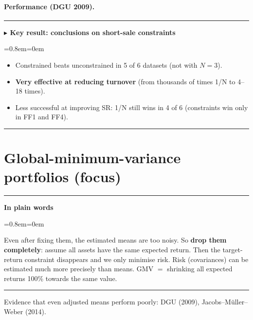 \documentclass[11pt,a4paper]{report}
\newenvironment{notebox}[1]
  {\par\medskip\Needspace{6\baselineskip}\noindent\rule{\linewidth}{0.4pt}\par\nopagebreak
   \noindent\textbf{#1}\par\nopagebreak
   \begin{list}{}{\leftmargin=0.8em\rightmargin=0em\topsep=2pt}\item[]}
  {\end{list}\nopagebreak\noindent\rule{\linewidth}{0.4pt}\par\medskip}
\newenvironment{keybox}[1][]{\begin{notebox}{$\blacktriangleright$ Key result#1}}{\end{notebox}}
\newenvironment{plainbox}{\begin{notebox}{In plain words}}{\end{notebox}}
\begin{document}
\paragraph{Performance (DGU 2009).}
\begin{center}\small
{}
\end{center}
\begin{keybox}[: conclusions on short-sale constraints]
\begin{itemize}
  \item Constrained beats unconstrained in 5 of 6 datasets (not with $N=3$).
  \item \textbf{Very effective at reducing turnover} (from thousands of times 1/N to 4--18 times).
  \item Less successful at improving SR: 1/N still wins in 4 of 6 (constraints win only in FF1 and FF4).
\end{itemize}
\end{keybox}

\section{Global-minimum-variance portfolios (focus)}
\begin{plainbox}
Even after fixing them, the estimated means are too noisy. So \textbf{drop them
completely}: assume all assets have the same expected return. Then the
target-return constraint disappears and we only minimise risk. Risk (covariances)
can be estimated much more precisely than means. GMV $=$ shrinking all expected
returns 100\% towards the same value.
\end{plainbox}
Evidence that even adjusted means perform poorly: DGU (2009), Jacobs--M\"uller--Weber (2014).
\end{document}
